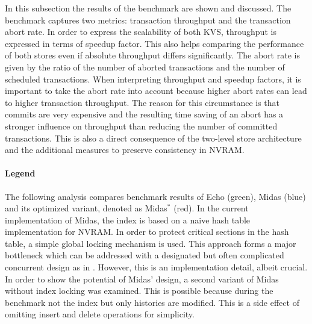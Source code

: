 In this subsection the results of the benchmark are shown and discussed. The
benchmark captures two metrics: transaction throughput and the transaction abort
rate. In order to express the scalability of both KVS, throughput is expressed
in terms of speedup factor. This also helps comparing the performance of both
stores even if absolute throughput differs significantly. The abort rate is
given by the ratio of the number of aborted transactions and the number of
scheduled transactions. When interpreting throughput and speedup factors, it is
important to take the abort rate into account because higher abort rates can
lead to higher transaction throughput. The reason for this circumstance is that
commits are very expensive and the resulting time saving of an abort has a
stronger influence on throughput than reducing the number of committed
transactions. This is also a direct consequence of the two-level store
architecture and the additional measures to preserve consistency in NVRAM.

\paragraph{Legend}

The following analysis compares benchmark results of Echo (green), Midas (blue)
and its optimized variant, denoted as Midas$^{*}$ (red). In the current
implementation of Midas, the index is based on a naive hash table implementation
for NVRAM. In order to protect critical sections in the hash table, a simple
global locking mechanism is used. This approach forms a major bottleneck which
can be addressed with a designated but often complicated concurrent design as in
\cite{fan2013memc3}. However, this is an implementation detail, albeit crucial.
In order to show the potential of Midas' design, a second variant of Midas
without index locking was examined. This is possible because during the
benchmark not the index but only histories are modified. This is a side effect
of omitting insert and delete operations for simplicity.

\newcommand{\midasopt}{Midas$^{*}$\xspace}
\newcommand{\midas}{Midas\xspace}
\newcommand{\echo}{Echo\xspace}
\newcommand{\ttp}{transaction throughput\xspace}
\newcommand{\tput}{throughput\xspace}
\newcommand{\eff}{parallel efficiency\xspace}


